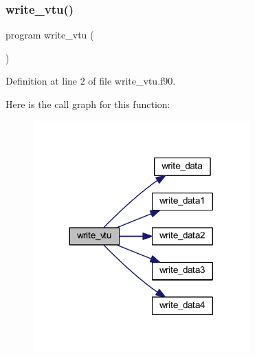 \subsubsection{\texorpdfstring{write\+\_\+vtu()}{write\_vtu()}}
{\footnotesize\ttfamily program write\+\_\+vtu (\begin{DoxyParamCaption}{ }\end{DoxyParamCaption})}



Definition at line 2 of file write\+\_\+vtu.\+f90.

Here is the call graph for this function\+:\nopagebreak
\begin{figure}[H]
\begin{center}
\leavevmode
\includegraphics[width=236pt]{write__vtu_8f90_a8bbc7ab4725ee50b236ba1ffab6f3b88_cgraph}
\end{center}
\end{figure}
